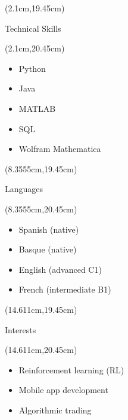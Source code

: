 \documentclass{resume} %
\begin{document}
\begin{multicols}{3}

\begin{textblock*}{5.8cm}(2.1cm,19.45cm) %
\begin{rSection}{\large{Technical Skills}}
\end{rSection}
\end{textblock*}

\begin{textblock*}{10cm}(2.1cm,20.45cm) %
\begin{itemize}\setlength\itemsep{-4.5pt}
    \item Python
    \item Java
    \item MATLAB
    \item SQL
    \item Wolfram Mathematica
\end{itemize}
\end{textblock*}

\begin{textblock*}{5.8cm}(8.3555cm,19.45cm) %
\begin{rSection}{\large{Languages}}
\end{rSection}
\end{textblock*}
\begin{textblock*}{10cm}(8.3555cm,20.45cm) %
\begin{itemize}\setlength\itemsep{-4.5pt}
    \item Spanish (native)
    \item Basque (native)
    \item English (advanced C1)
    \item French (intermediate B1)
\end{itemize}
\end{textblock*}

\begin{textblock*}{5.8cm}(14.611cm,19.45cm) %
\begin{rSection}{\large{Interests}}
\end{rSection}
\end{textblock*}
\begin{textblock*}{10cm}(14.611cm,20.45cm) %
\begin{itemize}\setlength\itemsep{-4.5pt}
    \item Reinforcement learning (RL)
    \item Mobile app development
    \item Algorithmic trading
    \end{itemize}
    \end{textblock*}

    
\end{multicols}

\end{document}

